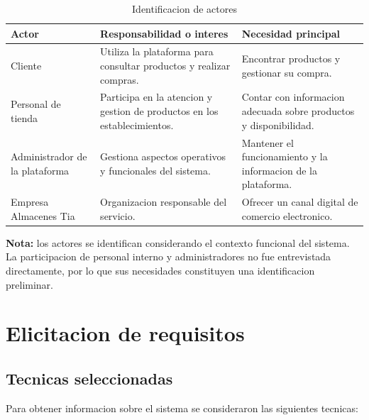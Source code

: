 \documentclass[11pt,a4paper]{article}
\begin{document}
\begin{table}[H]
\centering
\caption{Identificacion de actores}
\small
\begin{tabularx}{\textwidth}{p{3cm}YY}
\toprule
\textbf{Actor} &
\textbf{Responsabilidad o interes} &
\textbf{Necesidad principal} \\
\midrule

Cliente &
Utiliza la plataforma para consultar productos
y realizar compras. &
Encontrar productos y gestionar su compra. \\

Personal de tienda &
Participa en la atencion y gestion de productos
en los establecimientos. &
Contar con informacion adecuada sobre productos
y disponibilidad. \\

Administrador de la plataforma &
Gestiona aspectos operativos y funcionales
del sistema. &
Mantener el funcionamiento y la informacion
de la plataforma. \\

Empresa Almacenes Tia &
Organizacion responsable del servicio. &
Ofrecer un canal digital de comercio electronico. \\

\bottomrule
\end{tabularx}
\end{table}

\textbf{Nota:} los actores se identifican considerando
el contexto funcional del sistema. La participacion
de personal interno y administradores no fue
entrevistada directamente, por lo que sus necesidades
constituyen una identificacion preliminar.

\section{Elicitacion de requisitos}

\subsection{Tecnicas seleccionadas}

Para obtener informacion sobre el sistema se
consideraron las siguientes tecnicas:
\end{document}

